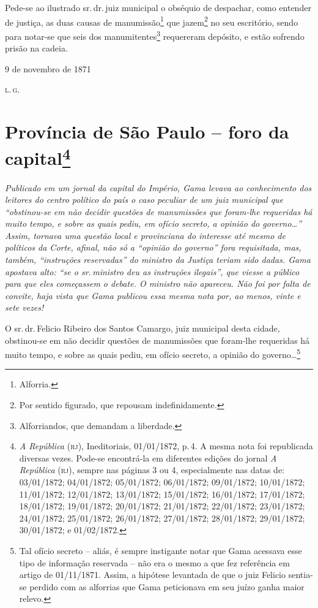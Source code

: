 Pede-se ao ilustrado sr.\,dr.\,juiz municipal o obséquio de despachar,
como entender de justiça, as duas causas de manumissão\footnote{
  Alforria.} que jazem\footnote{ Por sentido figurado, que repousam
  indefinidamente.} no seu escritório, sendo para notar-se que seis dos
manumitentes\footnote{ Alforriandos, que demandam a liberdade.}
requereram depósito, e estão sofrendo prisão na cadeia.

\begin{flushright}
9 de novembro de 1871

\textsc{l.\,g.}
\end{flushright}

\chapter{Província de São Paulo -- foro da capital\footnote{\emph{A República} (\textsc{rj}), Ineditoriais, 01/01/1872, p.\,4.
  A mesma nota foi republicada diversas vezes. Pode-se encontrá-la em
  diferentes edições do jornal \emph{A República} (\textsc{rj}), sempre nas
  páginas 3 ou 4, especialmente nas datas de: 03/01/1872; 04/01/1872;
  05/01/1872; 06/01/1872; 09/01/1872; 10/01/1872; 11/01/1872;
  12/01/1872; 13/01/1872; 15/01/1872; 16/01/1872; 17/01/1872;
  18/01/1872; 19/01/1872; 20/01/1872; 21/01/1872; 22/01/1872;
  23/01/1872; 24/01/1872; 25/01/1872; 26/01/1872; 27/01/1872;
  28/01/1872; 29/01/1872; 30/01/1872; e 01/02/1872.}} %

\begin{didascalia}
\emph{Publicado em um jornal da capital do Império, Gama levava ao
conhecimento dos leitores do centro político do país o caso peculiar de
um juiz municipal que ``obstinou-se em não decidir questões de
manumissões que foram-lhe requeridas há muito tempo, e sobre as quais
pediu, em ofício secreto, a opinião do governo\ldots{}'' Assim, tornava uma
questão local e provinciana do interesse até mesmo de políticos da
Corte, afinal, não só a ``opinião do governo'' fora requisitada, mas,
também, ``instruções reservadas'' do ministro da Justiça teriam sido
dadas. Gama apostava alto: ``se o sr.\,ministro deu as instruções
ilegais'', que viesse a público para que eles começassem o debate. O
ministro não apareceu. Não foi por falta de convite, haja vista que Gama
publicou essa mesma nota por, ao menos, vinte e sete vezes!}
\end{didascalia}

O sr.\,dr.\,Felicio Ribeiro dos Santos Camargo, juiz municipal desta
cidade, obstinou-se em não decidir questões de manumissões que foram-lhe
requeridas há muito tempo, e sobre as quais pediu, em ofício secreto, a
opinião do governo\ldots{}\footnote{ Tal ofício secreto -- aliás, é sempre
  instigante notar que Gama acessava esse tipo de informação reservada
  -- não era o mesmo a que fez referência em artigo de 01/11/1871.
  Assim, a hipótese levantada de que o juiz Felicio sentia-se perdido
  com as alforrias que Gama peticionava em seu juízo ganha maior relevo.}

